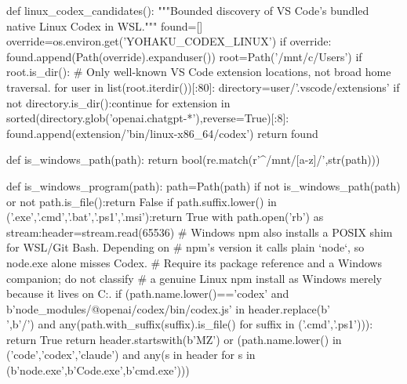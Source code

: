 def linux_codex_candidates():
    """Bounded discovery of VS Code's bundled native Linux Codex in WSL."""
    found=[]
    override=os.environ.get('YOHAKU_CODEX_LINUX')
    if override:
        found.append(Path(override).expanduser())
    root=Path('/mnt/c/Users')
    if root.is_dir():
        # Only well-known VS Code extension locations, not broad home traversal.
        for user in list(root.iterdir())[:80]:
            directory=user/'.vscode/extensions'
            if not directory.is_dir():continue
            for extension in sorted(directory.glob('openai.chatgpt-*'),reverse=True)[:8]:
                found.append(extension/'bin/linux-x86_64/codex')
    return found


def is_windows_path(path):
    return bool(re.match(r'^/mnt/[a-z]/',str(path)))

def is_windows_program(path):
    path=Path(path)
    if not is_windows_path(path) or not path.is_file():return False
    if path.suffix.lower() in ('.exe','.cmd','.bat','.ps1','.msi'):return True
    with path.open('rb') as stream:header=stream.read(65536)
    # Windows npm also installs a POSIX shim for WSL/Git Bash. Depending on
    # npm's version it calls plain `node`, so node.exe alone misses Codex.
    # Require its package reference and a Windows companion; do not classify
    # a genuine Linux npm install as Windows merely because it lives on C:.
    if (path.name.lower()=='codex' and b'node_modules/@openai/codex/bin/codex.js' in header.replace(b'\\',b'/')
            and any(path.with_suffix(suffix).is_file() for suffix in ('.cmd','.ps1'))):
        return True
    return header.startswith(b'MZ') or (path.name.lower() in ('code','codex','claude') and any(s in header for s in (b'node.exe',b'Code.exe',b'cmd.exe')))

